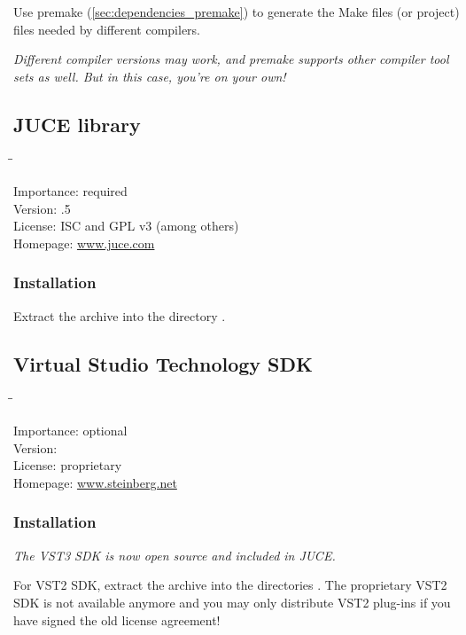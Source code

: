 Use premake (\ref{sec:dependencies_premake}) to generate the Make
files (or project) files needed by different compilers.

\emph{Different compiler versions may work, and premake supports other
  compiler tool sets as well.  But in this case, you're on your own!}

\subsection{JUCE library}

\begin{tabbing}
  \hspace*{6em}\=\=\kill

  Importance:  \> required \\
  Version:     .5 \\
  License:     \> ISC and GPL v3 (among others) \\
  Homepage:    \> \href{http://www.juce.com/}{www.juce.com}
\end{tabbing}

\subsubsection{Installation}

Extract the archive into the directory .

\subsection{Virtual Studio Technology SDK}

\begin{tabbing}
  \hspace*{6em}\=\=\kill

  Importance:  \> optional \\
  Version:      \\
  License:     \> proprietary \\
  Homepage:    \> \href{http://www.steinberg.net/en/company/developer.html}{www.steinberg.net}
\end{tabbing}

\subsubsection{Installation}

\emph{The VST3 SDK is now open source and included in JUCE.}

For VST2 SDK, extract the archive into the directories
.  The proprietary VST2 SDK is not available
anymore and you may only distribute VST2 plug-ins if you have signed
the old license agreement!

